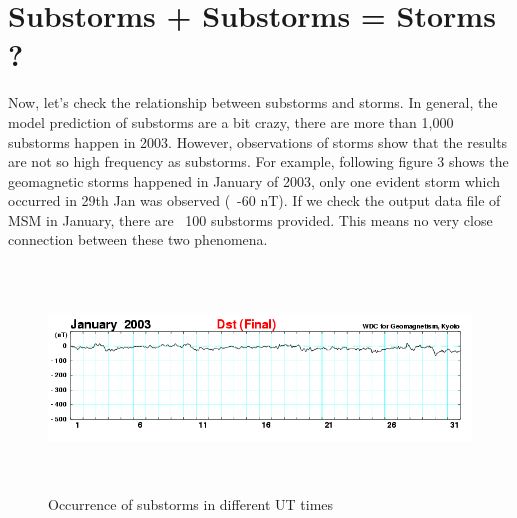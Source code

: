 \documentclass[12pt, letterpaper]{article} %
\begin{document}
\section{Substorms + Substorms = Storms ?} %

Now, let's check the relationship between substorms and storms. In general, the model prediction of substorms are a bit crazy, there are more than 1,000 substorms happen in 2003. However, observations of storms show that the results are not so high frequency as substorms. For example, following figure 3 shows the geomagnetic storms happened in January of 2003, only one evident storm which occurred in 29th Jan was observed (~-60 nT). If we check the output data file of MSM in January, there are ~100 substorms provided. This means no very close connection between these two phenomena. 

\begin{figure}[!t] %
\begin{center} %
  \includegraphics[width=15cm,height=6cm]{dst_200301.png} %
  \caption{Occurrence of substorms in different UT times} %
  \label{fig:3} %
\end{center} %
\end{figure} %



\clearpage %

\end{document}
